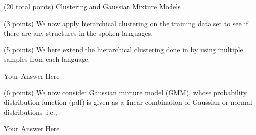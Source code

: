 \documentclass[12pt]{article}
\begin{document}
\begin{question}{(20 total points) Clustering and Gaussian Mixture Models}
\begin{subquestion}{(3 points)
       We now apply hierarchical clustering on the training data set
       to see if there are any structures in the spoken languages.
     }
   \end{subquestion}
   \begin{subquestion}{(5 points)
       We here extend the hierarchical clustering done in  by
       using multiple samples from each language.
     } \label{Q3.4}


   

      \begin{answerbox}{50em}
         Your Answer Here
      \end{answerbox}
  


   \end{subquestion}
   \begin{subquestion}{(6 points)
       We now consider Gaussian mixture model (GMM), whose
       probability distribution function (pdf) is given as
       a linear combination of Gaussian or normal distributions, i.e.,
     } \label{Q3.5}




      \begin{answerbox}{30em}
         Your Answer Here
      \end{answerbox}
  


   \end{subquestion}

   
\end{question}
\end{document}
